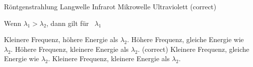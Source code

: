 \documentclass[11pt]{exam}
\begin{document}
\begin{questions}
\begin{choices}
	\choice Röntgenstrahlung
	\choice Langwelle
	\choice Infrarot
	\choice Mikrowelle
	\choice Ultraviolett (correct)
\end{choices}

\vspace{3mm}\question Wenn \( \lambda_1 > \lambda_2 \), dann gilt für  \( \lambda_1 \)

\begin{choices}
	\choice Kleinere Frequenz, höhere Energie als \( \lambda_2 \).
	\choice Höhere Frequenz, gleiche Energie wie \( \lambda_2 \).
	\choice Höhere Frequenz, kleinere Energie als \( \lambda_2 \). (correct)
	\choice Kleinere Frequenz, gleiche Energie wie \( \lambda_2 \).
	\choice Kleinere Frequenz, kleinere Energie als \( \lambda_2 \).
\end{choices}

\vspace{3mm}\end{questions}
\end{document}
